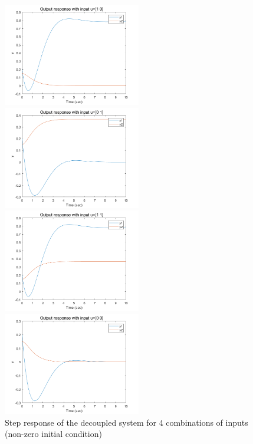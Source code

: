 \documentclass[hyperref]{article}
\theoremstyle{nonumberplain}
\begin{document}
	\begin{figure}[H]
		\centering
		\begin{minipage}[t]{0.48\textwidth}
			\centering
			\includegraphics[width=6cm]{fig32.png}
		\end{minipage}
		\begin{minipage}[t]{0.48\textwidth}
			\centering
			\includegraphics[width=6cm]{fig33.png}
		\end{minipage}
		\begin{minipage}[t]{0.48\textwidth}
			\centering
			\includegraphics[width=6cm]{fig34.png}
		\end{minipage}
		\begin{minipage}[t]{0.48\textwidth}
			\centering
			\includegraphics[width=6cm]{fig35.png}
		\end{minipage}
		\caption{Step response of the decoupled system for 4 combinations of inputs (non-zero initial condition)}
		\label{fig22}
	\end{figure}
	
\end{document}
